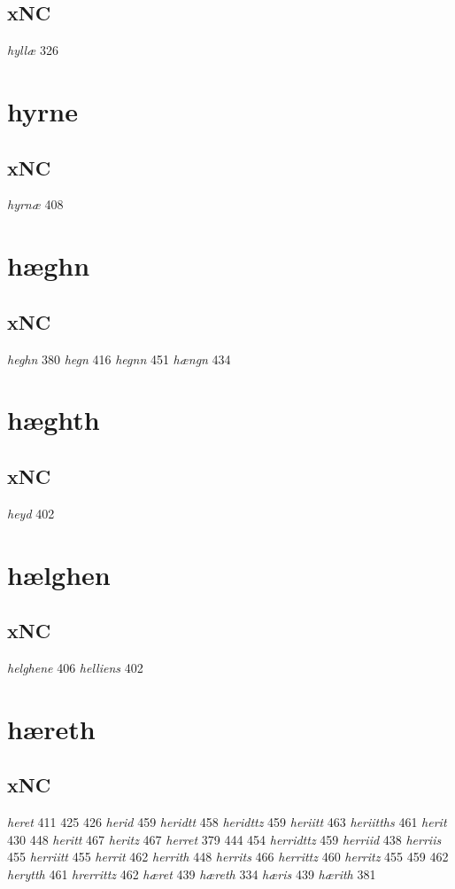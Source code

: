\documentclass[a4paper,twocolumn]{article}
\begin{document}
\subsection{xNC}
\label{sec:orgc447d9b}
\emph{hyllæ} 326 
\section{hyrne}
\label{sec:org78981d2}
\subsection{xNC}
\label{sec:org86712c9}
\emph{hyrnæ} 408 
\section{hæghn}
\label{sec:org4672ab4}
\subsection{xNC}
\label{sec:org7987113}
\emph{heghn} 380 \emph{hegn} 416 \emph{hegnn} 451 \emph{hængn} 434 
\section{hæghth}
\label{sec:orgb8df652}
\subsection{xNC}
\label{sec:orgfc2834a}
\emph{heyd} 402 
\section{hælghen}
\label{sec:org20dd02c}
\subsection{xNC}
\label{sec:org2febbb2}
\emph{helghene} 406 \emph{helliens} 402 
\section{hæreth}
\label{sec:org3cb5695}
\subsection{xNC}
\label{sec:org02d9dc3}
\emph{heret} 411 425 426 \emph{herid} 459 \emph{heridtt} 458 \emph{heridttz} 459 \emph{heriitt} 463 \emph{heriitths} 461 \emph{herit} 430 448 \emph{heritt} 467 \emph{heritz} 467 \emph{herret} 379 444 454 \emph{herridttz} 459 \emph{herriid} 438 \emph{herriis} 455 \emph{herriitt} 455 \emph{herrit} 462 \emph{herrith} 448 \emph{herrits} 466 \emph{herrittz} 460 \emph{herritz} 455 459 462 \emph{herytth} 461 \emph{hrerrittz} 462 \emph{hæret} 439 \emph{hæreth} 334 \emph{hæris} 439 \emph{hærith} 381 
\end{document}
